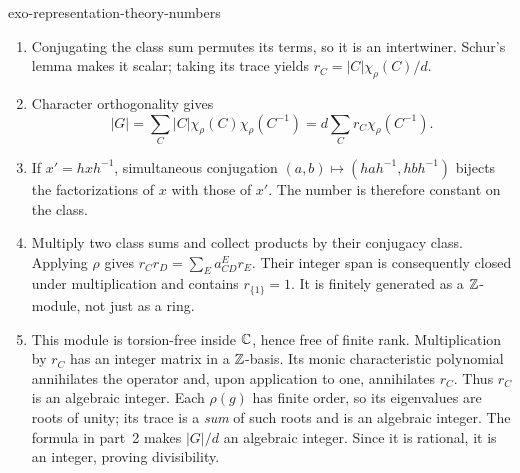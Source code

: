\begin{correction}{exo-representation-theory-numbers}
\begin{enumerate}
\item Conjugating the class sum permutes its terms, so it is an
intertwiner. Schur's lemma makes it scalar; taking its trace yields
$r_C=|C|\chi_\rho(C)/d$.
\item Character orthogonality gives
\[
 |G|=\sum_C|C|\chi_\rho(C)\chi_\rho(C^{-1})
      =d\sum_Cr_C\chi_\rho(C^{-1}).
\]
\item If $x'=hxh^{-1}$, simultaneous conjugation
$(a,b)\mapsto(hah^{-1},hbh^{-1})$ bijects the factorizations of $x$
with those of $x'$. The number is therefore constant on the class.
\item Multiply two class sums and collect products by their conjugacy
class. Applying $\rho$ gives $r_Cr_D=\sum_Ea_{CD}^Er_E$.
Their integer span is consequently closed under multiplication and
contains $r_{\{1\}}=1$. It is finitely generated as a $\mathbb{Z}$-module,
not just as a ring.
\item This module is torsion-free inside $\mathbb{C}$, hence free of finite
rank. Multiplication by $r_C$ has an integer matrix in a $\mathbb{Z}$-basis.
Its monic characteristic polynomial annihilates the operator and, upon
application to one, annihilates $r_C$. Thus $r_C$ is an algebraic integer.
Each $\rho(g)$ has finite order, so its eigenvalues are roots of unity;
its trace is a \emph{sum} of such roots and is an algebraic integer.
The formula in part~2 makes $|G|/d$ an algebraic integer. Since it is
rational, it is an integer, proving divisibility.
\end{enumerate}
\end{correction}

